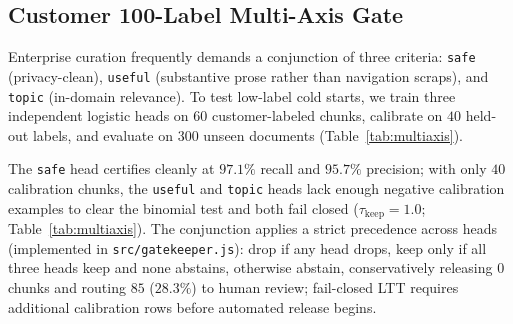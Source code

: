 \documentclass{article}
\begin{document}
\subsection{Customer 100-Label Multi-Axis Gate}
\label{sec:ltt-multi}
Enterprise curation frequently demands a conjunction of three criteria: \texttt{safe} (privacy-clean), \texttt{useful} (substantive prose rather than navigation scraps), and \texttt{topic} (in-domain relevance). To test low-label cold starts, we train three independent logistic heads on $60$ customer-labeled chunks, calibrate on $40$ held-out labels, and evaluate on $300$ unseen documents (Table~\ref{tab:multiaxis}).

\begin{table}[t]
\caption{Customer 100-label multi-axis gate ($60$ train, $40$ calibration, $300$ held-out). Uncertifiable heads fail closed at $\tau_{\text{keep}}=1.0$.}
\label{tab:multiaxis}
\vskip 0.08in
\begin{center}
\end{center}
\vskip -0.14in
\end{table}

The \texttt{safe} head certifies cleanly at $97.1\%$ recall and $95.7\%$ precision; with only $40$ calibration chunks, the \texttt{useful} and \texttt{topic} heads lack enough negative calibration examples to clear the binomial test and both fail closed ($\tau_{\text{keep}}=1.0$; Table~\ref{tab:multiaxis}). The conjunction applies a strict precedence across heads (implemented in \texttt{src/gatekeeper.js}): drop if any head drops, keep only if all three heads keep and none abstains, otherwise abstain, conservatively releasing $0$ chunks and routing $85$ ($28.3\%$) to human review; fail-closed LTT requires additional calibration rows before automated release begins.
\end{document}
